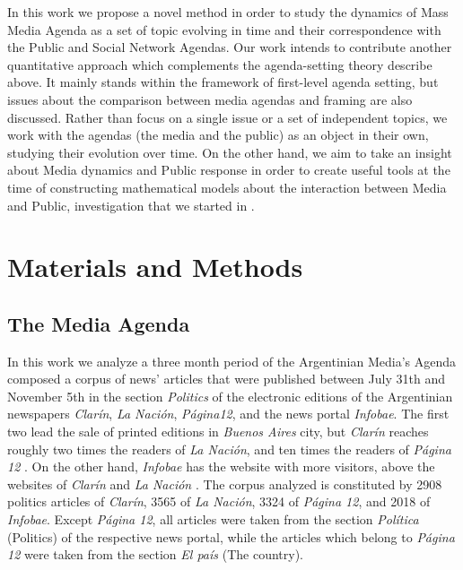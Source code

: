 \documentclass[a4paper, 12pt]{article}
\begin{document}
\par In this work we propose a novel method in order to study the dynamics of Mass Media Agenda as a set of topic evolving in time and their correspondence with the Public and Social Network Agendas.  Our work intends to contribute another quantitative approach which complements the agenda-setting theory describe above. It mainly stands within the framework of first-level agenda setting, but issues about the comparison between media agendas and framing are also discussed.
Rather than focus on a single issue or a set of independent topics, we work with the agendas (the media and the public) as an object in their own, studying their evolution over time. 
On the other hand, we aim to take an insight about Media dynamics and Public response in order to create useful tools at the time of constructing mathematical models about the interaction between Media and Public, investigation that we started in \cite{pinto2016setting}.

\section{Materials and Methods} \label{sec:MatMeth}

\subsection{The Media Agenda}

In this work we analyze a three month period of the Argentinian Media's Agenda composed a corpus of news' articles that were published between July 31th and November 5th in the section \emph{Politics} of the electronic editions of the Argentinian newspapers \emph{Clar\'in}, \emph{La Naci\'on}, \emph{P\'agina12}, and the news portal \emph{Infobae}. The first two lead the sale of printed editions in \emph{Buenos Aires} city, but \emph{Clar\'in} reaches roughly two times the readers of \emph{La Naci\'on}, and ten times the readers of \emph{P\'agina 12} \cite{IVC}. On the other hand, \emph{Infobae} has the website with more visitors, above the websites of \emph{Clar\'in} and \emph{La Naci\'on} \cite{AlexaAR}.
The corpus analyzed is constituted by 2908 politics articles of \emph{Clar\'in}, 3565 of \emph{La Naci\'on}, 3324 of \emph{P\'agina 12}, and 2018 of \emph{Infobae}. Except \emph{P\'agina 12}, all articles were taken from the section \emph{Pol\'itica}  (Politics) of the respective news portal, while the articles which belong to \emph{P\'agina 12} were taken from the section \emph{El pa\'is} (The country).
\end{document}
